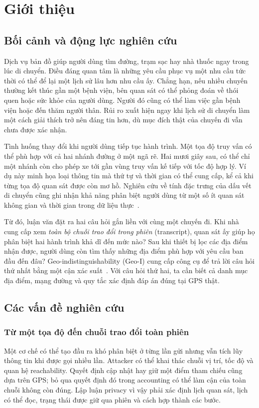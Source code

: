 \chapter{Giới thiệu}\label{ch:introduction}
\section{Bối cảnh và động lực nghiên cứu}
Dịch vụ bản đồ giúp người dùng tìm đường, trạm sạc hay nhà thuốc ngay trong lúc di chuyển.
Điều đáng quan tâm là những yêu cầu phục vụ một nhu cầu tức thời có thể để lại một lịch sử
lâu hơn nhu cầu ấy. Chẳng hạn, nếu nhiều chuyến thường kết thúc gần một bệnh viện, bên quan
sát có thể phỏng đoán về thói quen hoặc sức khỏe của người dùng. Người đó cũng có thể làm việc
gần bệnh viện hoặc đến thăm người thân. Rủi ro xuất hiện ngay khi lịch sử di chuyển làm một
cách giải thích trở nên đáng tin hơn, dù mục đích thật của chuyến đi vẫn chưa được xác nhận.

Tình huống thay đổi khi người dùng tiếp tục hành trình. Một tọa độ truy vấn có thể phù hợp với
cả hai nhánh đường ở một ngã rẽ. Hai mươi giây sau, có thể chỉ một nhánh còn cho phép xe tới
gần vùng truy vấn kế tiếp với tốc độ hợp lý. Ví dụ này minh họa loại thông tin mà thứ tự và
thời gian có thể cung cấp, kể cả khi từng tọa độ quan sát được còn mơ hồ. Nghiên cứu về tính
đặc trưng của dấu vết di chuyển cũng ghi nhận khả năng phân biệt người dùng từ một số ít quan sát
không gian và thời gian trong dữ liệu thực~\cite{mobilityunique}.

Từ đó, luận văn đặt ra hai câu hỏi gắn liền với cùng một chuyến đi. Khi nhà cung cấp xem
\emph{toàn bộ chuỗi trao đổi trong phiên} (transcript), quan sát ấy giúp họ phân biệt hai
hành trình khả dĩ đến mức nào? Sau khi thiết bị lọc các địa điểm nhận được, người dùng còn tìm
thấy những địa điểm phù hợp với yêu cầu ban đầu đến đâu? Geo-indistinguishability (Geo-I) cung
cấp công cụ để trả lời câu hỏi thứ nhất bằng một cận xác suất~\cite{geoi}. Với câu hỏi thứ hai,
ta cần biết cả danh mục địa điểm, mạng đường và quy tắc xác định đáp án đúng tại GPS thật.

\section{Các vấn đề nghiên cứu}
\subsection{Từ một tọa độ đến chuỗi trao đổi toàn phiên}
Một cơ chế có thể tạo đầu ra khó phân biệt ở từng lần gửi nhưng vẫn tích lũy thông tin khi được gọi
nhiều lần. Attacker có thể khai thác chuỗi vị trí, tốc độ và quan hệ reachability. Quyết định cập nhật
hay giữ một điểm tham chiếu cũng dựa trên GPS; bỏ qua quyết định đó trong accounting có thể làm cận
của toàn chuỗi không còn đúng. Lập luận privacy vì vậy phải xác định lịch quan sát, lịch có thể đọc,
trạng thái được giữ qua phiên và cách hợp thành các bước.

